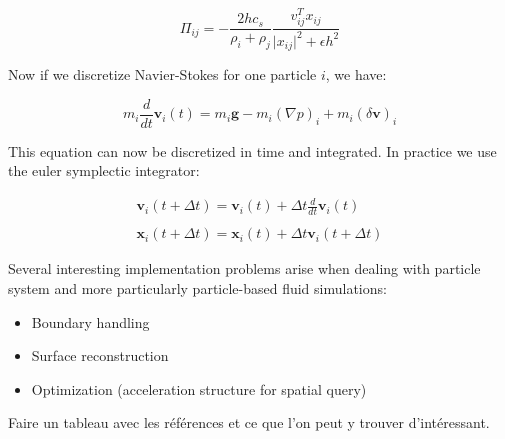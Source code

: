 \begin{equation}
\Pi_{ij} = -\frac{2hc_{s}}{\rho_{i}+\rho_{j}}\frac{v_{ij}^{T}x_{ij}}{\vert x_{ij} \vert^{2} + \epsilon h^{2}}
\end{equation}

Now if we discretize Navier-Stokes for one particle $i$, we have:

\begin{equation}
m_{i}\frac{d}{dt}\mathbf{v}_{i}(t) = m_{i}\mathbf{g} - m_{i}(\nabla p)_{i} + m_{i}(\delta \mathbf{v})_{i}
\end{equation}

This equation can now be discretized in time and integrated. In practice we use the euler symplectic integrator:

\begin{equation}
\begin{array}{ll}
\displaystyle \mathbf{v}_{i}(t+\Delta t) = \mathbf{v}_{i}(t) + \Delta t \frac{d}{dt}\mathbf{v}_{i}(t) \\ \\
\displaystyle \mathbf{x}_{i}(t+\Delta t) = \mathbf{x}_{i}(t) + \Delta t \mathbf{v}_{i}(t+\Delta t)
\end{array}
\end{equation}

Several interesting implementation problems arise when dealing with particle system and more particularly particle-based fluid simulations:

\begin{itemize}
\item Boundary handling 
\item Surface reconstruction
\item Optimization (acceleration structure for spatial query)
\end{itemize}

Faire un tableau avec les références et ce que l'on peut y trouver d'intéressant.


